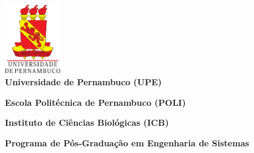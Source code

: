 \begin{titlepage}


\begin{center}

\includegraphics[height=30mm]{Figuras/Capa/brasao_upe}\\





{\textbf{Universidade de Pernambuco (UPE)}} %

{\textbf{Escola Politécnica de Pernambuco (POLI)}} %

{\textbf{Instituto de Ciências Biológicas (ICB)}} \\ \vspace{1ex}

{\textbf{Programa de Pós-Graduação em Engenharia de Sistemas}} \\ \vspace{1ex}

\vspace{1.0in}


\end{center}
\end{titlepage}
